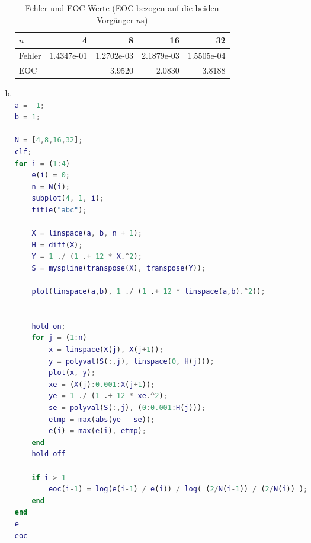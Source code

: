 \documentclass{mywork}
\begin{document}
\begin{aufgabe}
\begin{enumerate}[a)]
		\begin{table}[h]
			\centering
			\caption{Fehler und EOC-Werte (EOC bezogen auf die beiden Vorgänger $n$s)}
			\begin{tabular}{l|rrrr}
				$n$ & 4 & 8 & 16 & 32 \\ \hline
				Fehler & 1.4347e-01 & 1.2702e-03 & 2.1879e-03 & 1.5505e-04 \\ \hline
				EOC & & 3.9520 & 2.0830 & 3.8188
			\end{tabular}
		\end{table}
		\newpage
		\item
			\begin{lstlisting}[language=matlab,tabsize=4]
% Stephan Hilb, 2706616

a = -1;
b = 1;

N = [4,8,16,32];
clf;
for i = (1:4)
	e(i) = 0;
	n = N(i);
    subplot(4, 1, i);
	title("abc");

	X = linspace(a, b, n + 1);
	H = diff(X);
	Y = 1 ./ (1 .+ 12 * X.^2);
	S = myspline(transpose(X), transpose(Y));

	plot(linspace(a,b), 1 ./ (1 .+ 12 * linspace(a,b).^2));


	hold on;
	for j = (1:n)
		x = linspace(X(j), X(j+1));
		y = polyval(S(:,j), linspace(0, H(j)));
		plot(x, y);
		xe = (X(j):0.001:X(j+1));
		ye = 1 ./ (1 .+ 12 * xe.^2);
		se = polyval(S(:,j), (0:0.001:H(j)));
		etmp = max(abs(ye - se));
		e(i) = max(e(i), etmp);
	end
	hold off

	if i > 1
		eoc(i-1) = log(e(i-1) / e(i)) / log( (2/N(i-1)) / (2/N(i)) );
	end
end
e
eoc
			\end{lstlisting}
	\end{enumerate}
\end{aufgabe}
\end{document}
